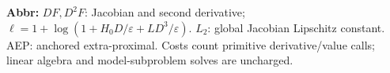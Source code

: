 \begin{table}[tp]
\begin{threeparttable}
\begin{tabularx}{\linewidth}{@{}>{\raggedright\arraybackslash}p{0.20\linewidth}>{\raggedright\arraybackslash}p{0.32\linewidth}>{\raggedright\arraybackslash}p{0.25\linewidth}>{\raggedright\arraybackslash}X@{}}
\bottomrule
\end{tabularx}
\begin{tablenotes}[flushleft]\footnotesize
\item[] \textbf{Abbr:} $DF,D^2F$: Jacobian and second derivative; $\ell=1+\log(1+H_0D/\varepsilon+LD^3/\varepsilon)$. $L_2$: global Jacobian Lipschitz constant. AEP: anchored extra-proximal. Costs count primitive derivative/value calls; linear algebra and model-subproblem solves are uncharged.
\end{tablenotes}
\end{threeparttable}
\end{table}
\clearpage
